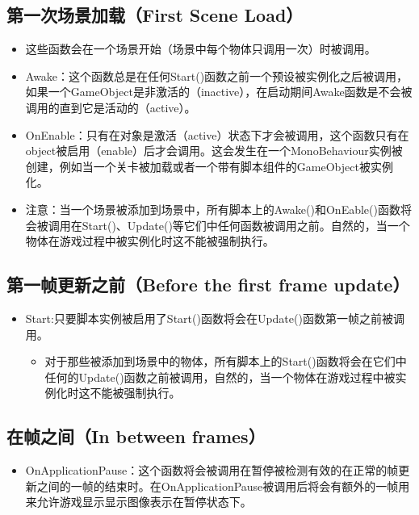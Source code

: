 \documentclass[9pt, b5paper]{article}
\begin{document}
\subsection{第一次场景加载（First Scene Load）}
\label{sec:org68314d3}
\begin{itemize}
\item 这些函数会在一个场景开始（场景中每个物体只调用一次）时被调用。
\item Awake：这个函数总是在任何Start()函数之前一个预设被实例化之后被调用，如果一个GameObject是非激活的（inactive），在启动期间Awake函数是不会被调用的直到它是活动的（active）。
\item OnEnable：只有在对象是激活（active）状态下才会被调用，这个函数只有在object被启用（enable）后才会调用。这会发生在一个MonoBehaviour实例被创建，例如当一个关卡被加载或者一个带有脚本组件的GameObject被实例化。
\item 注意：当一个场景被添加到场景中，所有脚本上的Awake()和OnEable()函数将会被调用在Start()、Update()等它们中任何函数被调用之前。自然的，当一个物体在游戏过程中被实例化时这不能被强制执行。
\end{itemize}
\subsection{第一帧更新之前（Before the first frame update）}
\label{sec:org2c7d23b}
\begin{itemize}
\item Start:只要脚本实例被启用了Start()函数将会在Update()函数第一帧之前被调用。 
\begin{itemize}
\item 对于那些被添加到场景中的物体，所有脚本上的Start()函数将会在它们中任何的Update()函数之前被调用，自然的，当一个物体在游戏过程中被实例化时这不能被强制执行。
\end{itemize}
\end{itemize}
\subsection{在帧之间（In between frames）}
\label{sec:orgbc8a07f}
\begin{itemize}
\item OnApplicationPause：这个函数将会被调用在暂停被检测有效的在正常的帧更新之间的一帧的结束时。在OnApplicationPause被调用后将会有额外的一帧用来允许游戏显示显示图像表示在暂停状态下。
\end{itemize}
\end{document}
